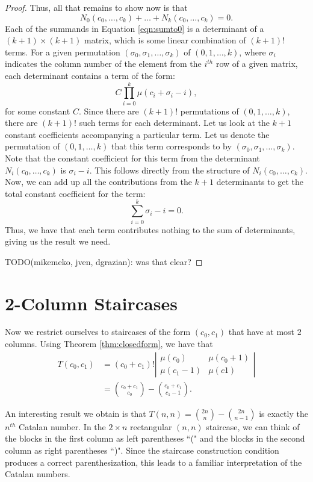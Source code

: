 \documentclass[12pt]{amsart}
\newcommand{\N}{N}
\newcommand{\newsection}[2]{
\section{#1 \label{#2}}
}
\begin{document}
\begin{proof}
Thus, all that remains to show now is that
\begin{equation}
\N_0(c_0,\dots,c_k) + \dots + \N_k(c_0,\dots,c_k) = 0.
\label{eqn:sumto0}
\end{equation}
Each of the summands in Equation \ref{eqn:sumto0} is a determinant of a $(k+1)\times(k+1)$ matrix, which is some linear combination of $(k+1)!$ terms. For a given permutation $(\sigma_0, \sigma_1, \dots, \sigma_k)$ of $(0,1,\dots,k)$, where $\sigma_i$ indicates the column number of the element from the $i^{th}$ row of a given matrix, each determinant contains a term of the form:
$$
C \prod_{i=0}^{k}{\mu(c_i+\sigma_i-i)},
$$
for some constant $C$. Since there are $(k+1)!$ permutations of $(0,1,\dots,k)$, there are $(k+1)!$ such terms for each determinant. Let us look at the $k+1$ constant coefficients accompanying a particular term. Let us denote the permutation of $(0,1,\dots,k)$ that this term corresponds to by $(\sigma_0, \sigma_1, \dots, \sigma_k)$. Note that the constant coefficient for this term from the determinant $\N_i(c_0,\dots,c_k)$ is $\sigma_i - i$. This follows directly from the structure of $\N_i(c_0,\dots,c_k)$. Now, we can add up all the contributions from the $k+1$ determinants to get the total constant coefficient for the term:
$$
\sum_{i=0}^{k}{\sigma_i-i} = 0.
$$
Thus, we have that each term contributes nothing to the sum of determinants, giving us the result we need.

TODO(mikemeko, jven, dgrazian): was that clear?
\end{proof}

\newsection{2-Column Staircases}{sec:twocolumn}
Now we restrict ourselves to staircases of the form $(c_0,c_1)$ that have at most $2$ columns. Using Theorem \ref{thm:closedform}, we have that
\begin{align*}
T(c_0,c_1) & = (c_0 + c_1)! \left|
\begin{matrix}
\mu(c_0) & \mu(c_0 + 1) \\
\mu(c_1 - 1) & \mu(c1)
\end{matrix}\right| \\
& =\binom{c_0 + c_1}{c_0} - \binom{c_0 + c_1}{c_1 - 1}.
\end{align*}

An interesting result we obtain is that $T(n,n) = \binom{2n}{n} - \binom{2n}{n-1}$ is exactly the $n^{th}$ Catalan number. In the $2 \times n$ rectangular $(n,n)$ staircase, we can think of the blocks in the first column as left parentheses ``(" and the blocks in the second column as right parentheses ``)". Since the staircase construction condition produces a correct parenthesization, this leads to a familiar interpretation of the Catalan numbers. 
\end{document}
